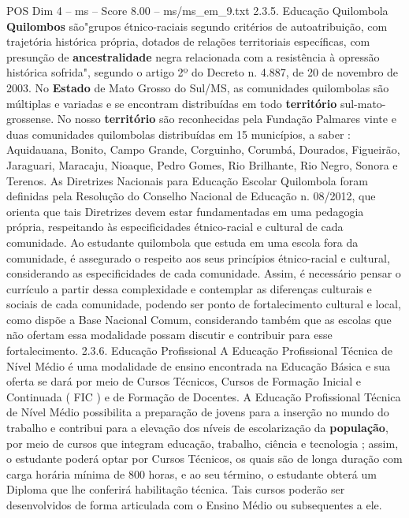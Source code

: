 \begin{textsample}{POS Dim 4 – ms – Score 8.00 – ms/ms\_em\_9.txt}  \label{ex:f4_pos_155}
2.3.5.
Educação Quilombola \textbf{Quilombos} são"grupos étnico-raciais segundo critérios de autoatribuição, com trajetória histórica própria, dotados de relações territoriais específicas, com presunção de \textbf{ancestralidade} negra relacionada com a resistência à opressão histórica sofrida", segundo o artigo 2º do Decreto n. 4.887, de 20 de novembro de 2003.
No \textbf{Estado} de Mato Grosso do Sul/MS, as comunidades quilombolas são múltiplas e variadas e se encontram distribuídas em todo \textbf{território} sul-mato-grossense.
No nosso \textbf{território} são reconhecidas pela Fundação Palmares vinte e duas comunidades quilombolas distribuídas em 15 municípios, a saber : Aquidauana, Bonito, Campo Grande, Corguinho, Corumbá, Dourados, Figueirão, Jaraguari, Maracaju, Nioaque, Pedro Gomes, Rio Brilhante, Rio Negro, Sonora e Terenos.
As Diretrizes Nacionais para Educação Escolar Quilombola foram definidas pela Resolução do Conselho Nacional de Educação n. 08/2012, que orienta que tais Diretrizes devem estar fundamentadas em uma pedagogia própria, respeitando às especificidades étnico-racial e cultural de cada comunidade.
Ao estudante quilombola que estuda em uma escola fora da comunidade, é assegurado o respeito aos seus princípios étnico-racial e cultural, considerando as especificidades de cada comunidade.
Assim, é necessário pensar o currículo a partir dessa complexidade e contemplar as diferenças culturais e sociais de cada comunidade, podendo ser ponto de fortalecimento cultural e local, como dispõe a Base Nacional Comum, considerando também que as escolas que não ofertam essa modalidade possam discutir e contribuir para esse fortalecimento. 2.3.6.
Educação Profissional A Educação Profissional Técnica de Nível Médio é uma modalidade de ensino encontrada na Educação Básica e sua oferta se dará por meio de Cursos Técnicos, Cursos de Formação Inicial e Continuada ( FIC ) e de Formação de Docentes.
A Educação Profissional Técnica de Nível Médio possibilita a preparação de jovens para a inserção no mundo do trabalho e contribui para a elevação dos níveis de escolarização da \textbf{população}, por meio de cursos que integram educação, trabalho, ciência e tecnologia ; assim, o estudante poderá optar por Cursos Técnicos, os quais são de longa duração com carga horária mínima de 800 horas, e ao seu término, o estudante obterá um Diploma que lhe conferirá habilitação técnica.
Tais cursos poderão ser desenvolvidos de forma articulada com o Ensino Médio ou subsequentes a ele.

\end{textsample}

